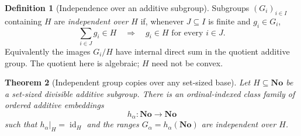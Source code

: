 \documentclass[11pt,letterpaper]{article}
\newtheorem{theorem}{Theorem}[section]
\theoremstyle{definition}
\newtheorem{definition}[theorem]{Definition}
\theoremstyle{remark}
\newcommand{\No}{\mathbf{No}}
\newcommand{\id}{\operatorname{id}}
\numberwithin{equation}{section}
\begin{document}
\begin{definition}[Independence over an additive subgroup]
Subgroups $(G_i)_{i\in I}$ containing $H$ are \emph{independent over $H$}
if, whenever $J\subseteq I$ is finite and $g_i\in G_i$,
\[
 \sum_{i\in J}g_i\in H\quad\Longrightarrow\quad
 g_i\in H\text{ for every }i\in J.
\]
Equivalently the images $G_i/H$ have internal direct sum in the quotient
additive group. The quotient here is algebraic; $H$ need not be convex.
\end{definition}

\begin{theorem}[Independent group copies over any set-sized base]
\label{isc:thm:group}
Let $H\subseteq\No$ be a set-sized divisible additive subgroup. There is
an ordinal-indexed class family of ordered additive embeddings
\[
 h_\alpha:\No\longrightarrow\No
\]
such that $h_\alpha|_H=\id_H$ and the ranges $G_\alpha=h_\alpha(\No)$
are independent over $H$.
\end{theorem}
\end{document}
